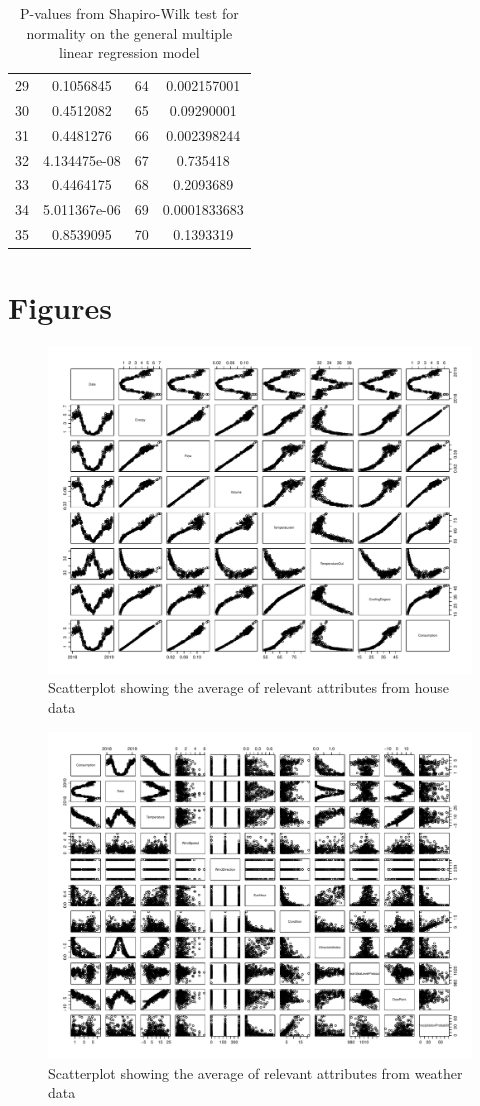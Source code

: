 \begin{table}
\begin{tabular}{c:c|c:c}
        29 & 0.1056845 & 64 & 0.002157001\\ 
        30 & 0.4512082 & 65 & 0.09290001\\ 
        31 & 0.4481276 & 66 & 0.002398244\\ 
        32 & 4.134475e-08 & 67 & 0.735418\\ 
        33 & 0.4464175 & 68 & 0.2093689\\ 
        34 & 5.011367e-06 & 69 & 0.0001833683 \\ 
        35 & 0.8539095 & 70 & 0.1393319\\
        \hline
    \end{tabular}
    \caption{P-values from Shapiro-Wilk test for normality on the general multiple linear regression model}
    \label{tab: shapiro_multiple_lm}
\end{table}


\chapter{Figures}
\begin{figure}
    \centering
    \includegraphics[width=.8\textwidth]{../../../figures/house_attri.pdf}
    \caption{Scatterplot showing the average of relevant attributes from house data}
    \label{fig: house_attri}
\end{figure}

\begin{figure}
    \centering
    \includegraphics[width=.8\textwidth]{../../../figures/weather_cons.pdf}
    \caption{Scatterplot showing the average of relevant attributes from weather data}
    \label{fig: weather_cons}
\end{figure}
